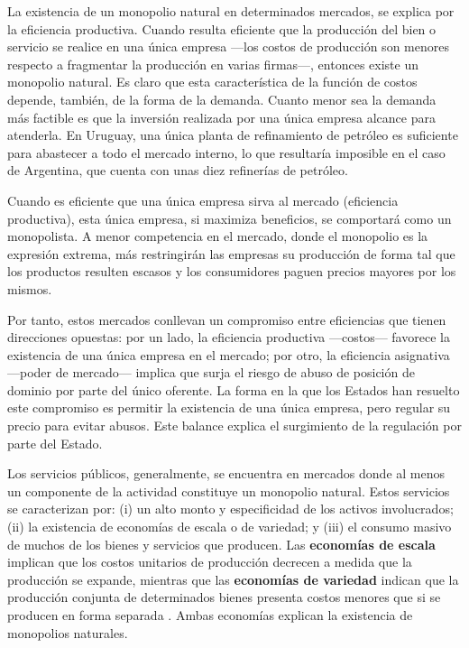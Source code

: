 \documentclass[
  12pt,
  spanish,
]{book}
\begin{document}
La existencia de un monopolio natural en determinados mercados, se
explica por la eficiencia productiva. Cuando resulta eficiente que la
producción del bien o servicio se realice en una única empresa ---los
costos de producción son menores respecto a fragmentar la producción en
varias firmas---, entonces existe un monopolio natural. Es claro que
esta característica de la función de costos depende, también, de la
forma de la demanda. Cuanto menor sea la demanda más factible es que la
inversión realizada por una única empresa alcance para atenderla. En
Uruguay, una única planta de refinamiento de petróleo es suficiente para
abastecer a todo el mercado interno, lo que resultaría imposible en el
caso de Argentina, que cuenta con unas diez refinerías de petróleo.

Cuando es eficiente que una única empresa sirva al mercado (eficiencia
productiva), esta única empresa, si maximiza beneficios, se comportará
como un monopolista. A menor competencia en el mercado, donde el
monopolio es la expresión extrema, más restringirán las empresas su
producción de forma tal que los productos resulten escasos y los
consumidores paguen precios mayores por los mismos.

Por tanto, estos mercados conllevan un compromiso entre eficiencias que
tienen direcciones opuestas: por un lado, la eficiencia productiva
---costos--- favorece la existencia de una única empresa en el mercado;
por otro, la eficiencia asignativa ---poder de mercado--- implica que
surja el riesgo de abuso de posición de dominio por parte del único
oferente. La forma en la que los Estados han resuelto este compromiso es
permitir la existencia de una única empresa, pero regular su precio para
evitar abusos. Este balance explica el surgimiento de la regulación por
parte del Estado.

Los servicios públicos, generalmente, se encuentra en mercados donde al
menos un componente de la actividad constituye un monopolio natural.
Estos servicios se caracterizan por: (i) un alto monto y especificidad
de los activos involucrados; (ii) la existencia de economías de escala o
de variedad; y (iii) el consumo masivo de muchos de los bienes y
servicios que producen. Las \textbf{economías de escala} implican que
los costos unitarios de producción decrecen a medida que la producción
se expande, mientras que las \textbf{economías de variedad} indican que
la producción conjunta de determinados bienes presenta costos menores
que si se producen en forma separada \citep{Bergara2003}. Ambas
economías explican la existencia de monopolios naturales.
\end{document}
